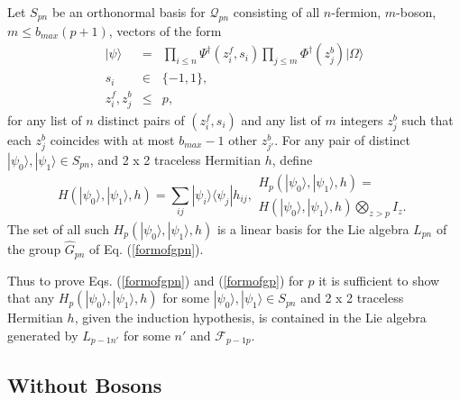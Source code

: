\documentclass[12pt,amsmath,amssymb,onecolumn]{revtex4-2}
\begin{document}
Let $S_{p n}$ be an orthonormal basis for $\mathcal{Q}_{p n}$ consisting of
all $n$-fermion, $m$-boson, $m \le b_{max}( p + 1)$, vectors of the form
\begin{subequations}
\begin{eqnarray}
\label{psi0}
| \psi  \rangle  & = & \prod_{i \le n} \Psi^{\dagger}( z^f_i, s_i) \prod_{ j \le m}\Phi^{\dagger}(z^b_j) |\Omega \rangle  \\
\label{psi1}
s_i  & \in & \{ -1, 1 \}, \\
\label{psi2}
z^f_i, z^b_j & \le & p,
\end{eqnarray}
\end{subequations}
for any list of $n$ distinct pairs of $(z^f_i, s_i)$ and
any list of $m$ integers $z^b_j$ such that
each $z^b_j$ coincides with at most $b_{max} -1$ other $z^b_{j'}$.
For any pair of distinct $|\psi_0 \rangle , |\psi_1 \rangle  \in S_{p n}$, and
2 x 2 traceless Hermitian $h$, define
\begin{subequations}
\begin{equation}
\label{defcaph}
H( |\psi_0 \rangle , |\psi_1 \rangle , h) = \sum_{ij} |\psi_i \rangle \langle \psi_j| h_{ij},
\end{equation}
\begin{multline}
\label{defcaph1}
H_p( |\psi_0 \rangle , |\psi_1 \rangle , h) = \\ H( |\psi_0 \rangle , |\psi_1 \rangle , h) \bigotimes_{z>p} I_z.
\end{multline}
\end{subequations}
The set of all such $H_p( |\psi_0 \rangle , |\psi_1 \rangle , h)$ is a linear basis
for the Lie algebra $L_{p n}$ of the group $\hat{G}_{p n}$ of Eq. (\ref{formofgpn}). 


Thus to prove Eqs. (\ref{formofgpn}) and (\ref{formofgp}) for $p$ it is 
sufficient to show that any $H_p( |\psi_0 \rangle , |\psi_1 \rangle , h)$ for some $|\psi_0 \rangle , |\psi_1 \rangle  \in S_{p n}$ and
2 x 2 traceless Hermitian $h$, given the induction hypothesis, is contained in the Lie algebra generated
by $L_{p-1 n'}$ for some $n'$ and $\mathcal{F}_{p-1 p}$.

\subsection{\label{app:withoutbosons} Without Bosons}
\end{document}
